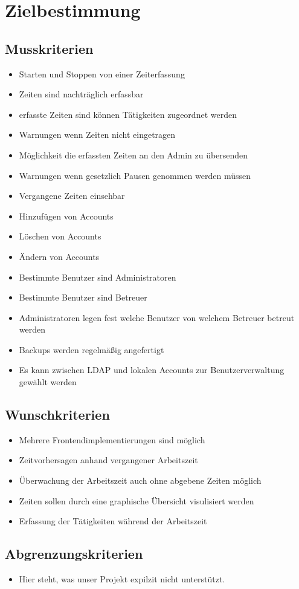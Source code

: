 \section{Zielbestimmung}

\subsection{Musskriterien}

\begin{itemize}
	\item Starten und Stoppen von einer Zeiterfassung
	\item Zeiten sind nachträglich erfassbar
	\item erfasste Zeiten sind können Tätigkeiten zugeordnet werden
	\item Warnungen wenn Zeiten nicht eingetragen
	\item Möglichkeit die erfassten Zeiten an den Admin zu übersenden
	\item Warnungen wenn gesetzlich Pausen genommen werden müssen
	\item Vergangene Zeiten einsehbar
	\item Hinzufügen von Accounts
	\item Löschen von Accounts
	\item Ändern von Accounts
	\item Bestimmte Benutzer sind Administratoren
	\item Bestimmte Benutzer sind Betreuer
	\item Administratoren legen fest welche Benutzer von welchem Betreuer betreut werden
	\item Backups werden regelmäßig angefertigt
	\item Es kann zwischen LDAP und lokalen Accounts zur Benutzerverwaltung gewählt werden
\end{itemize}


\subsection{Wunschkriterien}

\begin{itemize}
	\item Mehrere Frontendimplementierungen sind möglich
	\item Zeitvorhersagen anhand vergangener Arbeitszeit
	\item Überwachung der Arbeitszeit auch ohne abgebene Zeiten möglich
	\item Zeiten sollen durch eine graphische Übersicht visulisiert werden
	\item Erfassung der Tätigkeiten während der Arbeitszeit

\end{itemize}


\subsection{Abgrenzungskriterien}
\begin{itemize}
	\item Hier steht, was unser Projekt expilzit nicht unterstützt.
\end{itemize}
